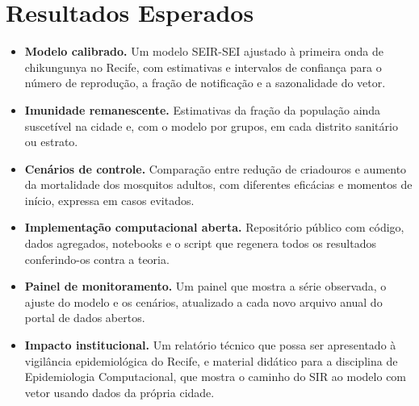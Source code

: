 \section{Resultados Esperados}
\label{sec:resultados_esperados}

\begin{itemize}

  \item \textbf{Modelo calibrado.} Um modelo SEIR-SEI ajustado à primeira onda de chikungunya no Recife,
  com estimativas e intervalos de confiança para o número de reprodução, a fração de notificação e a
  sazonalidade do vetor.

  \item \textbf{Imunidade remanescente.} Estimativas da fração da população ainda suscetível na cidade e,
  com o modelo por grupos, em cada distrito sanitário ou estrato.

  \item \textbf{Cenários de controle.} Comparação entre redução de criadouros e aumento da mortalidade dos
  mosquitos adultos, com diferentes eficácias e momentos de início, expressa em casos evitados.

  \item \textbf{Implementação computacional aberta.} Repositório público com código, dados agregados,
  notebooks e o script que regenera todos os resultados conferindo-os contra a teoria.

  \item \textbf{Painel de monitoramento.} Um painel que mostra a série observada, o ajuste do modelo e os
  cenários, atualizado a cada novo arquivo anual do portal de dados abertos.

  \item \textbf{Impacto institucional.} Um relatório técnico que possa ser apresentado à vigilância
  epidemiológica do Recife, e material didático para a disciplina de Epidemiologia Computacional, que
  mostra o caminho do SIR ao modelo com vetor usando dados da própria cidade.

\end{itemize}
